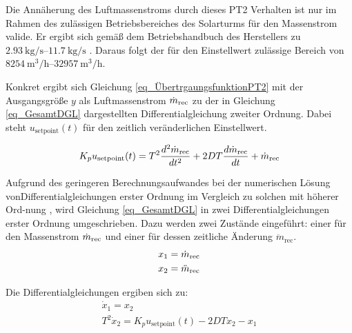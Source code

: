 Die Annäherung des Luftmassenstroms durch dieses PT2 Verhalten ist nur im Rahmen des zulässigen Betriebsbereiches des Solarturms für den Massenstrom valide.
Er ergibt sich gemäß dem Betriebshandbuch des Herstellers zu $\SIrange{2.93}{11.7}{\kilo\gram\per\second}$ \cite[S.28]{HandbuchJülich}.
Daraus folgt der für den Einstellwert zulässige Bereich von $\SIrange{8254}{32957}{\metre\cubed\per\hour}$.

Konkret ergibt sich Gleichung \ref{eq_ÜbertrgaungsfunktionPT2} mit der Ausgangsgröße $y$ als Luftmassenstrom $\dot{m}_{\mathrm{rec}}$ zu der in Gleichung \ref{eq_GesamtDGL} dargestellten Differentialgleichung zweiter Ordnung.
Dabei steht $u_{\mathrm{setpoint}}(t)$ für den zeitlich veränderlichen Einstellwert.

\begin{equation} \label{eq_GesamtDGL}
K_p u_{\mathrm{setpoint}}(t) = T^2 \frac{d^2\dot{m}_{\mathrm{rec}}}{dt^2} + 2 D T \frac{d\dot{m}_{\mathrm{rec}}}{dt} + \dot{m}_{\mathrm{rec}}
\end{equation}

Aufgrund des geringeren Berechnungsaufwandes bei der numerischen Lösung von\linebreak Differentialgleichungen erster Ordnung im Vergleich zu solchen mit höherer Ord-\linebreak nung \cite[S.138-139]{Gausch}\cite[S.241ff]{Howell}, wird Gleichung \ref{eq_GesamtDGL} in zwei Differentialgleichungen erster Ordnung umgeschrieben.
Dazu werden zwei Zustände eingeführt: einer für den Massenstrom $\dot{m}_{\mathrm{rec}}$ und einer für dessen zeitliche Änderung $\ddot{m}_{\mathrm{rec}}$.
\begin{equation} \label{eq_Einführtungstates}
\begin{gathered}
    x_1 = \dot{m}_{\mathrm{rec}}\\
    x_2 = \ddot{m}_{\mathrm{rec}}
\end{gathered}
\end{equation}

Die Differentialgleichungen ergiben sich zu:
\begin{equation} \label{eq_DGLsMassflow}
\begin{gathered}
    \dot{x}_1 = x_2\\
    T^2 \dot{x}_2 = K_p  u_{\mathrm{setpoint}}(t) - 2 D T x_2 - x_1
\end{gathered}
\end{equation}

